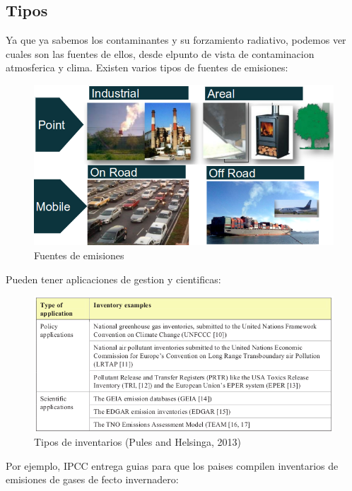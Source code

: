\documentclass[]{book}
\begin{document}
\hypertarget{tipos}{%
\subsection{Tipos}\label{tipos}}

Ya que ya sabemos los contaminantes y su forzamiento radiativo, podemos ver cuales son las fuentes de ellos, desde elpunto de vista de contaminacion atmosferica y clima. Existen varios tipos de fuentes de emisiones:

\begin{figure}
\includegraphics[width=1.3\linewidth]{figs/fuentes} \caption{Fuentes de emisiones}\label{fig:unnamed-chunk-21}
\end{figure}

Pueden tener aplicaciones de gestion y cientificas:

\begin{figure}
\includegraphics[width=1.5\linewidth]{figs/theart2} \caption{Tipos de inventarios (Pules and Helsinga, 2013)}\label{fig:unnamed-chunk-22}
\end{figure}

Por ejemplo, IPCC entrega guias para que los paises compilen inventarios de emisiones de gases de fecto invernadero:
\end{document}
